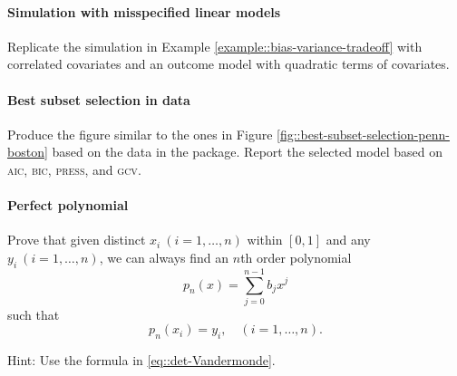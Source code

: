 \paragraph{Simulation with misspecified linear models}

Replicate the simulation in Example \ref{example::bias-variance-tradeoff} with correlated covariates and an outcome model with quadratic terms of covariates. 

\paragraph{Best subset selection in  data}

Produce the figure similar to the ones in Figure \ref{fig::best-subset-selection-penn-boston} based on the  data in the  package. Report the selected model based on \textsc{aic}, \textsc{bic}, \textsc{press}, and \textsc{gcv}. 


 \paragraph{Perfect polynomial}\label{hw12::perfect-polynomial}
 
Prove that given distinct $x_i \ (i=1, \ldots, n)$ within $[0,1]$ and any $y_i\ (i=1, \ldots, n)$, we can always find an $n$th order polynomial 
$$
p_n(x) = \sum_{j=0}^{n-1} b_j x^j
$$ 
such that 
$$
p_n(x_i) = y_i, \quad  (i=1, \ldots, n).
$$

Hint: Use the formula in \eqref{eq::det-Vandermonde}. 
 
 
 
 

